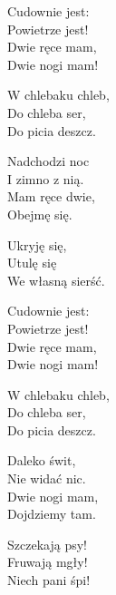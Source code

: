 \begin{text}
    Cudownie jest:\\
    Powietrze jest!\\
    Dwie ręce mam,\\
    Dwie nogi mam!

    W chlebaku chleb,\\
    Do chleba ser,\\
    Do picia deszcz.

    Nadchodzi noc\\
    I zimno z nią.\\
    Mam ręce dwie,\\
    Obejmę się.

    Ukryję się,\\
    Utulę się\\
    We własną sierść.

    Cudownie jest:\\
    Powietrze jest!\\
    Dwie ręce mam,\\
    Dwie nogi mam!

    W chlebaku chleb,\\
    Do chleba ser,\\
    Do picia deszcz.

    Daleko świt,\\
    Nie widać nic.\\
    Dwie nogi mam,\\
    Dojdziemy tam.

    Szczekają psy!\\
    Fruwają mgły!\\
    Niech pani śpi!
\end{text}
